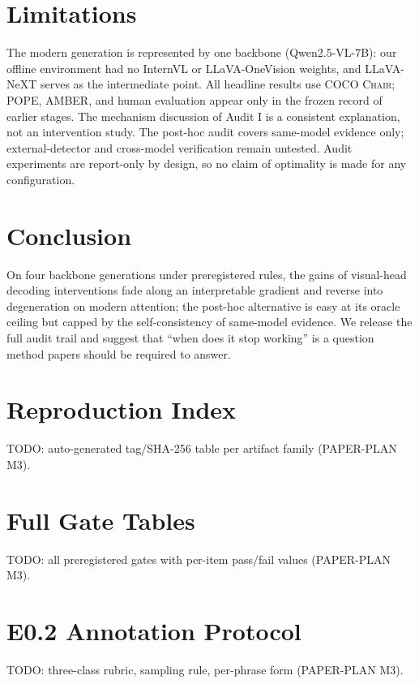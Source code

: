 \documentclass[11pt]{article}
\newcommand{\chair}{\textsc{Chair}}
\begin{document}
\section{Limitations}
\label{sec:limitations}
The modern generation is represented by one backbone (Qwen2.5-VL-7B): our offline environment had no InternVL or LLaVA-OneVision weights, and LLaVA-NeXT serves as the intermediate point. All headline results use COCO \chair{}; POPE, AMBER, and human evaluation appear only in the frozen record of earlier stages. The mechanism discussion of Audit I is a consistent explanation, not an intervention study. The post-hoc audit covers same-model evidence only; external-detector and cross-model verification remain untested. Audit experiments are report-only by design, so no claim of optimality is made for any configuration.

\section{Conclusion}
On four backbone generations under preregistered rules, the gains of visual-head decoding interventions fade along an interpretable gradient and reverse into degeneration on modern attention; the post-hoc alternative is easy at its oracle ceiling but capped by the self-consistency of same-model evidence. We release the full audit trail and suggest that ``when does it stop working'' is a question method papers should be required to answer.




\appendix
\section{Reproduction Index}
TODO: auto-generated tag/SHA-256 table per artifact family (PAPER-PLAN M3).
\section{Full Gate Tables}
TODO: all preregistered gates with per-item pass/fail values (PAPER-PLAN M3).
\section{E0.2 Annotation Protocol}
TODO: three-class rubric, sampling rule, per-phrase form (PAPER-PLAN M3).
\end{document}
